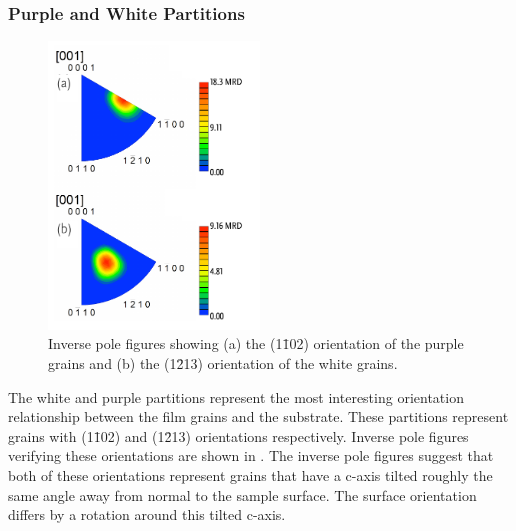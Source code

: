 \subsubsection{Purple and White Partitions}
\label{subsubsec:single.growth.purplewhite}

\begin{figure}
	\begin{center}
		\includegraphics[width=0.5\textwidth]{purplewhiteipf.pdf}
		\caption[Inverse pole figures for purple and white grains]{%
         	Inverse pole figures showing (a) the (1\={1}02) orientation of the purple 
         	grains and (b) the (1\={2}13) orientation of the white grains.}
		\label{fig:purplewhiteipf}
	\end{center}
\end{figure}
The white and purple partitions represent the most interesting orientation relationship
between the film grains and the substrate. These partitions represent grains with
(1\={1}02) and (1\={2}13) orientations respectively. Inverse pole figures verifying these
orientations are shown in . The inverse pole figures suggest
that both of these orientations represent grains that have a c-axis tilted roughly the
same angle away from normal to the sample surface. The surface orientation differs by a
rotation around this tilted c-axis.
